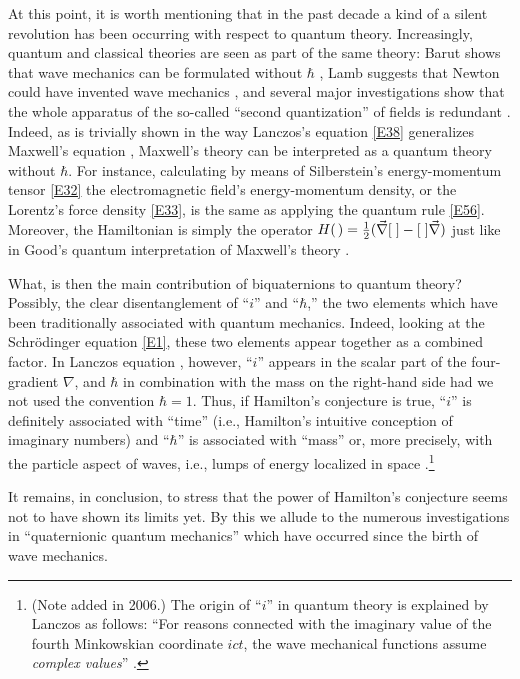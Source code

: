 \documentclass [12pt,a4paper      ]{article}
\newcommand{\Q}{[\hspace{1.mm}]} %
\newcommand{\A}{(\hspace{.5mm})} %
\begin{document}
     At  this  point,  it is worth mentioning that in  the  past 
decade  a  kind  of a silent revolution has  been  occurring  with 
respect to quantum theory.   Increasingly,  quantum and classical 
theories  are seen as part of the same theory:  Barut shows  that 
wave mechanics can be formulated without $\hbar$ \cite{R45}, Lamb suggests 
that  Newton could have invented wave mechanics \cite{R46}, and  several 
major investigations show that the whole apparatus of the so-called  
``second  quantization''  of fields is  redundant  \cite{R47}.  
Indeed,  as is trivially shown in the way Lanczos's equation \eqref{E38} 
generalizes Maxwell's equation \cite{R31},  Maxwell's theory can be interpreted 
as a quantum theory without $\hbar$.  For instance, calculating  by 
means of Silberstein's energy-momentum tensor \eqref{E32} the electromagnetic 
field's energy-momentum density, or the Lorentz's force density \eqref{E33}, 
is the same as applying the quantum rule \eqref{E56}.  Moreover, 
the Hamiltonian is simply the operator 
$H\A  = \tfrac{1}{2}(\vec{\nabla}\Q  - \Q \vec{\nabla})$ just like in Good's 
quantum interpretation of Maxwell's theory \cite{R48}.

     What,  is then the main contribution of biquaternions to 
quantum theory?   Possibly,  the clear disentanglement of ``$i$'' and 
``$\hbar$,''  the  two elements which have been traditionally  associated 
with  quantum  mechanics.   Indeed,  looking at  the  Schr\"odinger 
equation \eqref{E1},  these two elements appear together as a  combined 
factor. In Lanczos equation \cite{R38}, however, ``$i$'' appears in the 
scalar part of the four-gradient $\nabla$, and $\hbar$ in combination 
with the mass on  the right-hand side had we not
used the convention $\hbar=1$.  Thus, if Hamilton's conjecture is true, 
``$i$'' is definitely associated with ``time'' (i.e., Hamilton's intuitive 
conception of imaginary numbers) and ``$\hbar$'' is associated with ``mass'' 
or, more precisely, with the particle aspect of waves, i.e., lumps 
of energy localized in space \cite{R49,R43}.\footnote{(Note added in 2006.) The origin of ``$i$'' in quantum theory is explained by Lanczos as follows: ``For reasons connected with the imaginary value of the fourth Minkowskian coordinate $ict$, the wave mechanical functions assume \emph{complex values}'' \cite[p. 268]{LANCZ1970-}.}

     It  remains,  in  conclusion,  to stress that the  power  of 
Hamilton's conjecture seems not to have shown its limits yet.  By 
this  we  allude to the numerous investigations in  ``quaternionic 
quantum  mechanics''  which have occurred since the birth  of  wave 
mechanics.
\end{document}

